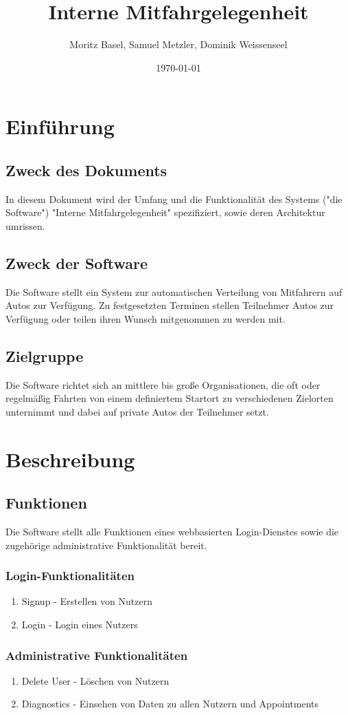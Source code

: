 \documentclass[11pt,a4paper]{article}
\author{Moritz Basel, Samuel Metzler, Dominik Weissenseel}
\title{Interne Mitfahrgelegenheit}
\date{\today{}}
\begin{document}
\normalfont


\maketitle{}
\tableofcontents{}

\section{Einführung}
\subsection{Zweck des Dokuments}
In diesem Dokument wird der Umfang und die Funktionalität des Systems ("die Software") "Interne Mitfahrgelegenheit" spezifiziert, sowie deren Architektur umrissen.
\subsection{Zweck der Software}
Die Software stellt ein System zur automatischen Verteilung von Mitfahrern auf Autos zur Verfügung. Zu festgesetzten Terminen stellen Teilnehmer Autos zur Verfügung oder teilen ihren Wunsch mitgenommen zu werden mit.
\subsection{Zielgruppe}
Die Software richtet sich an mittlere bis große Organisationen, die oft oder regelmäßig Fahrten von einem definiertem Startort zu verschiedenen Zielorten unternimmt und dabei auf private Autos der Teilnehmer setzt.
\section{Beschreibung}
\subsection{Funktionen}
Die Software stellt alle Funktionen eines webbasierten Login-Dienstes sowie die zugehörige administrative Funktionalität  bereit.
\subsubsection{Login-Funktionalitäten}
\begin{enumerate}
\item Signup - Erstellen von Nutzern
\item Login - Login eines Nutzers
\end{enumerate}
\subsubsection{Administrative Funktionalitäten}
\begin{enumerate}
\item Delete User - Löschen von Nutzern
\item Diagnostics - Einsehen von Daten zu allen Nutzern und Appointments
\end{enumerate}
\end{document}
